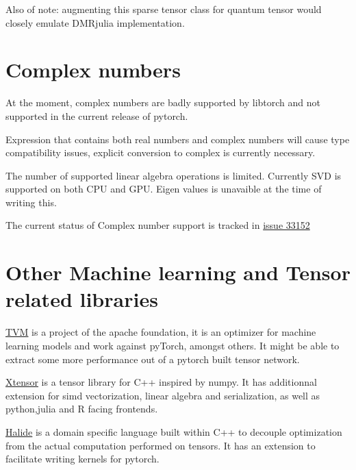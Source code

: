 \documentclass[15pt]{article}
\begin{document}
Also of note: augmenting this sparse tensor class for quantum tensor would closely emulate DMRjulia implementation.

\section{Complex numbers}
At the moment, complex numbers are badly supported by libtorch and not supported in the current release of pytorch.

Expression that contains both real numbers and complex numbers will cause type compatibility issues, explicit conversion to complex is currently necessary.

The number of supported linear algebra operations is limited. Currently SVD is supported on both CPU and GPU.
Eigen values is unavaible at the time of writing this.

The current status of Complex number support is tracked in \href{https://github.com/pytorch/pytorch/issues/33152}{issue 33152}

\section{Other Machine learning and Tensor related libraries}

\href{http://tvm.apache.org/}{TVM} is a project of the apache foundation, it is an optimizer for machine learning models and work against pyTorch, amongst others.
It might be able to extract some more performance out of a pytorch built tensor network.

\href{https://github.com/xtensor-stack/xtensor}{Xtensor} is a tensor library for C++ inspired by numpy. It has additionnal extension for simd vectorization, linear algebra and serialization, as well as python,julia and R facing frontends.

\href{https://halide-lang.org/}{Halide} is a domain specific language built within C++ to decouple optimization from the actual computation performed on tensors. It has an extension to facilitate writing kernels for pytorch.
\end{document}
